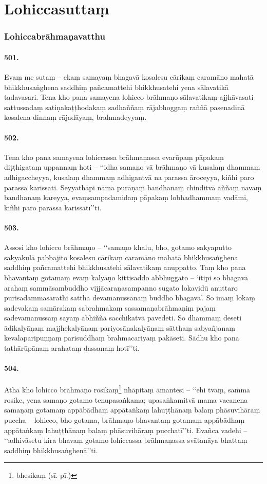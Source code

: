 \section{Lohiccasuttaṃ}

\subsubsection{Lohiccabrāhmaṇavatthu}

\paragraph{501.} Evaṃ me sutaṃ – ekaṃ samayaṃ bhagavā kosalesu cārikaṃ caramāno mahatā bhikkhusaṅghena saddhiṃ pañcamattehi bhikkhusatehi yena sālavatikā tadavasari. Tena kho pana samayena lohicco brāhmaṇo sālavatikaṃ ajjhāvasati sattussadaṃ satiṇakaṭṭhodakaṃ sadhaññaṃ rājabhoggaṃ raññā pasenadinā kosalena dinnaṃ rājadāyaṃ, brahmadeyyaṃ.

\paragraph{502.} Tena kho pana samayena lohiccassa brāhmaṇassa evarūpaṃ pāpakaṃ diṭṭhigataṃ uppannaṃ hoti – ‘‘idha samaṇo vā brāhmaṇo vā kusalaṃ dhammaṃ adhigaccheyya, kusalaṃ dhammaṃ adhigantvā na parassa āroceyya, kiñhi paro parassa karissati. Seyyathāpi nāma purāṇaṃ bandhanaṃ chinditvā aññaṃ navaṃ bandhanaṃ kareyya, evaṃsampadamidaṃ pāpakaṃ lobhadhammaṃ vadāmi, kiñhi paro parassa karissatī’’ti.

\paragraph{503.} Assosi kho lohicco brāhmaṇo – ‘‘samaṇo khalu, bho, gotamo sakyaputto sakyakulā pabbajito kosalesu cārikaṃ caramāno mahatā bhikkhusaṅghena saddhiṃ pañcamattehi bhikkhusatehi sālavatikaṃ anuppatto. Taṃ kho pana bhavantaṃ gotamaṃ evaṃ kalyāṇo kittisaddo abbhuggato – ‘itipi so bhagavā arahaṃ sammāsambuddho vijjācaraṇasampanno sugato lokavidū anuttaro purisadammasārathi satthā devamanussānaṃ buddho bhagavā’. So imaṃ lokaṃ sadevakaṃ samārakaṃ sabrahmakaṃ sassamaṇabrāhmaṇiṃ pajaṃ sadevamanussaṃ sayaṃ abhiññā sacchikatvā pavedeti. So dhammaṃ deseti ādikalyāṇaṃ majjhekalyāṇaṃ pariyosānakalyāṇaṃ sātthaṃ sabyañjanaṃ kevalaparipuṇṇaṃ parisuddhaṃ brahmacariyaṃ pakāseti. Sādhu kho pana tathārūpānaṃ arahataṃ dassanaṃ hotī’’ti.

\paragraph{504.} Atha kho lohicco brāhmaṇo rosikaṃ\footnote{bhesikaṃ (sī. pī.)} nhāpitaṃ āmantesi – ‘‘ehi tvaṃ, samma rosike, yena samaṇo gotamo tenupasaṅkama; upasaṅkamitvā mama vacanena samaṇaṃ gotamaṃ appābādhaṃ appātaṅkaṃ lahuṭṭhānaṃ balaṃ phāsuvihāraṃ puccha – lohicco, bho gotama, brāhmaṇo bhavantaṃ gotamaṃ appābādhaṃ appātaṅkaṃ lahuṭṭhānaṃ balaṃ phāsuvihāraṃ pucchatī’’ti. Evañca vadehi – ‘‘adhivāsetu kira bhavaṃ gotamo lohiccassa brāhmaṇassa svātanāya bhattaṃ saddhiṃ bhikkhusaṅghenā’’ti.

